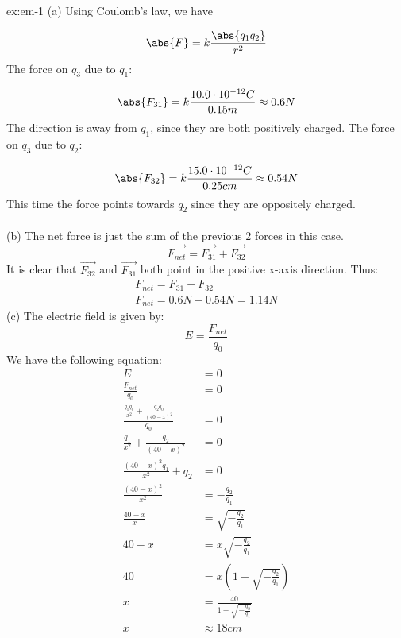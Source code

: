 
\begin{solution}{ex:em-1}
  (a)
  Using Coulomb's law, we have

  \[\abs{F}=k \frac{\abs{q_1q_2}}{r^2}\]
  The force on $q_3$ due to $q_1$:

  \[\abs{F_{31}}=k \frac{10.0 \cdot 10^{-12} C}{0.15m} \approx 0.6N\]
  The direction is away from $q_1$, since they are both positively charged. The force on $q_3$ due to $q_2$:

  \[
    \abs{F_{32}}=k \frac{15.0 \cdot 10^{-12} C}{0.25cm} \approx 0.54 N 
  \]
  This time the force points towards $q_2$ since they are oppositely charged.\\\\
  (b)
  The net force is just the sum of the previous 2 forces in this case.
  \[\overrightarrow{F_{net}}=\overrightarrow{F_{31}}+\overrightarrow{F_{32}}\]
  It is clear that $\overrightarrow{F_{32}}$ and $\overrightarrow{F_{31}}$ both point in the positive x-axis direction. Thus:
  \[
  \begin{gathered}
        F_{net}=F_{31}+F_{32}\\
        F_{net}=0.6N+0.54N=1.14N
  \end{gathered}
\]
  (c)
  The electric field is given by:
  \[
    E=\frac{F_{net}}{q_0}
  \]
  We have the following equation:
  \[
    \begin{aligned}
      E&=0\\
      \frac{F_{net}}{q_0}&=0\\
      \frac{\frac{q_1q_0}{x^2}+\frac{q_2q_0}{(40-x)^2}}{q_0}&=0\\
      \frac{q_1}{x^2}+\frac{q_2}{(40-x)^2}&=0\\
      \frac{(40-x)^2q_1}{x^2}+q_2&=0\\
      \frac{(40-x)^2}{x^2}&=-\frac{q_2}{q_1}\\
      \frac{40-x}{x}&=\sqrt{-\frac{q_2}{q_1}}\\
      40-x&=x\sqrt{-\frac{q_2}{q_1}}\\
      40&=x(1+\sqrt{-\frac{q_2}{q_1}})\\
      x&=\frac{40}{1+\sqrt{-\frac{q_2}{q_1}}}\\
      x&\approx18cm
    \end{aligned}
  \]
\end{solution}
